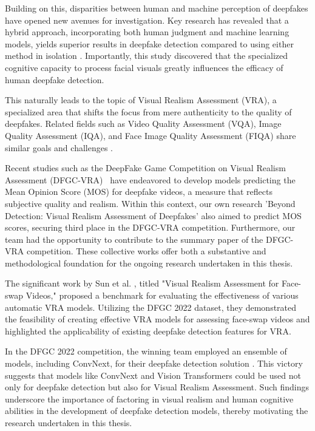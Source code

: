 \documentclass[a4paper,12pt,openright]{book}
\begin{document}
Building on this, disparities between human and machine perception of deepfakes have opened new avenues for investigation. Key research has revealed that a hybrid approach, incorporating both human judgment and machine learning models, yields superior results in deepfake detection compared to using either method in isolation \cite{DBLP:journals/corr/abs-2105-06496}. Importantly, this study discovered that the specialized cognitive capacity to process facial visuals greatly influences the efficacy of human deepfake detection.

This naturally leads to the topic of Visual Realism Assessment (VRA), a specialized area that shifts the focus from mere authenticity to the quality of deepfakes. Related fields such as Video Quality Assessment (VQA), Image Quality Assessment (IQA), and Face Image Quality Assessment (FIQA) share similar goals and challenges \cite{babnik2023diffiqa, DBLP:journals/corr/abs-2201-11975,zhao2023zoomvqa}.

Recent studies such as the DeepFake Game Competition on Visual Realism Assessment (DFGC-VRA)~\cite{peng_etal_2023} have endeavored to develop models predicting the Mean Opinion Score (MOS) for deepfake videos, a measure that reflects subjective quality and realism. Within this context, our own research 'Beyond Detection: Visual Realism Assessment of Deepfakes' \cite{dragar2023detection} also aimed to predict MOS scores, securing third place in the DFGC-VRA competition. Furthermore, our team had the opportunity to contribute to the summary paper of the DFGC-VRA competition. These collective works offer both a substantive and methodological foundation for the ongoing research undertaken in this thesis.

The significant work by Sun et al. \cite{sun2023visual}, titled "Visual Realism Assessment for Face-swap Videos," proposed a benchmark for evaluating the effectiveness of various automatic VRA models. Utilizing the DFGC 2022 dataset, they demonstrated the feasibility of creating effective VRA models for assessing face-swap videos and highlighted the applicability of existing deepfake detection features for VRA.

In the DFGC 2022 competition, the winning team employed an ensemble of models, including ConvNext, for their deepfake detection solution \cite{peng2022dfgc}. This victory suggests that models like ConvNext and Vision Transformers could be used not only for deepfake detection but also for Visual Realism Assessment. Such findings underscore the importance of factoring in visual realism and human cognitive abilities in the development of deepfake detection models, thereby motivating the research undertaken in this thesis.
\end{document}
